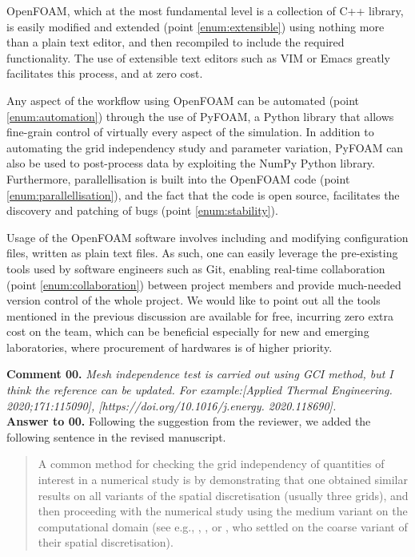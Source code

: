 \documentclass[12pt]{article}
\newcounter{question}
\newcommand{\name}{00}
\newcommand{\question}[1]{\refstepcounter{question} \noindent \textbf{Comment \name.\thequestion}\vskip 0.25cm \noindent \emph{#1}\\}
\newcommand{\answer}[1]{\noindent \textbf{Answer to \name.\thequestion}\vskip 0.25cm \noindent #1 \mbox{}\\}
\begin{document}
{    OpenFOAM, which at the most fundamental level is a collection of C++ library, is easily modified and extended (point \ref{enum:extensible}) using nothing more than a plain text editor, and then recompiled to include the required functionality. The use of extensible text editors such as VIM or Emacs greatly facilitates this process, and at zero cost.

    Any aspect of the workflow using OpenFOAM can be automated (point \ref{enum:automation}) through the use of PyFOAM, a Python library that allows fine-grain control of virtually every aspect of the simulation. In addition to automating the grid independency study and parameter variation, PyFOAM can also be used to post-process data by exploiting the NumPy Python library. Furthermore, parallellisation is built into the OpenFOAM code (point \ref{enum:parallellisation}), and the fact that the code is open source, facilitates the discovery and patching of bugs (point \ref{enum:stability}).

    Usage of the OpenFOAM software involves including and modifying configuration files, written as plain text files. As such, one can easily leverage the pre-existing tools used by software engineers such as Git, enabling real-time collaboration (point \ref{enum:collaboration}) between project members and provide much-needed version control of the whole project. We would like to point out all the tools mentioned in the previous discussion are available for free, incurring zero extra cost on the team, which can be beneficial especially for new and emerging laboratories, where procurement of hardwares is of higher priority.
}

\question{
    Mesh independence test is carried out using GCI method, but I think the reference can be updated. For example:[Applied Thermal Engineering. 2020;171:115090], [https://doi.org/10.1016/j.energy.
    2020.118690].
}

\answer{
  Following the suggestion from the reviewer, we added the following sentence in the revised manuscript.

  \begin{quotation}
    \color{blue}
    \noindent A common method for checking the grid independency of quantities of interest in a numerical study is by demonstrating that one obtained similar results on all variants of the spatial discretisation (usually three grids), and then proceeding with the numerical study using the medium variant on the computational domain (see e.g., \citet{Ding2013}, \citet{Ding2019}, or \citet{Wang2020}, who settled on the coarse variant of their spatial discretisation).
    \color{black}
  \end{quotation}
}
\end{document}

